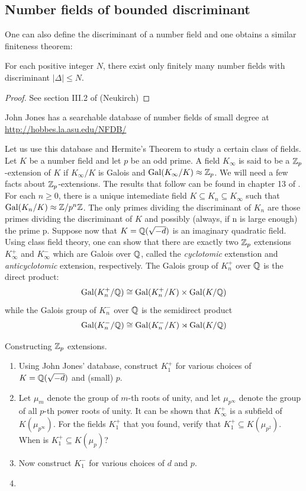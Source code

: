 \documentclass{book}
\begin{document}
\subsection{Number fields of bounded discriminant}

One can also define the discriminant of a number field and one obtains a
similar finiteness theorem:

\begin{theorem}
For each positive integer $N$, there exist only finitely many number
fields with discriminant $|\Delta| \leq N$.
\end{theorem}
\begin{proof}
See section III.2 of (Neukirch)
\end{proof}

John Jones has a searchable database of number fields of small degree
at \url{http://hobbes.la.asu.edu/NFDB/}

Let us use this database and Hermite's Theorem to study a certain class
of fields.  Let $K$ be a number field and let $p$ be an odd prime.  A field
$K_\infty$ is said to be a $\mathbb{Z}_p$-extension of $K$ if $K_\infty/K$ is Galois
and $\mathrm{Gal}(K_\infty/K) \approx \mathbb{Z}_p$.  We will need a few facts
about $\mathbb{Z}_p$-extensions.  The results that follow can be found in
chapter 13 of \cite{washington:cyclo}.
For each $n \geq 0$, there is a unique intemediate field
$K \subseteq K_n \subseteq K_\infty$ such that $\mathrm{Gal}(K_n/K)
\approx \mathbb{Z}/p^n\mathbb{Z}$.  The only primes dividing the discriminant of $K_n$
are those primes dividing the discriminant of $K$ and possibly (always,
if n is large enough) the prime p.  Suppose now that $K = \mathbb{Q}(\sqrt{-d})$
is an imaginary quadratic field.  Using class field theory, one can show
that there are exactly two $\mathbb{Z}_p$ extensions $K_\infty^+$ and
$K_\infty^-$ which are Galois over $\mathbb{Q}$, called the \textit{cyclotomic}
extenstion and \textit{anticyclotomic} extension, respectively.
The Galois group of $K_n^+$ over $\mathbb{Q}$ is the
direct product:
$$
\mathrm{Gal}(K_n^+/\mathbb{Q}) \cong \mathrm{Gal}(K_n^+/K) \times
\mathrm{Gal}(K/\mathbb{Q})
$$
while the Galois group of $K_n^-$ over $\mathbb{Q}$ is the semidirect product
$$
\mathrm{Gal}(K_n^-/\mathbb{Q}) \cong \mathrm{Gal}(K_n^-/K) \rtimes
\mathrm{Gal}(K/\mathbb{Q})
$$

\begin{exercise} Constructing $\mathbb{Z}_p$ extensions.
\begin{enumerate}
\item Using John Jones' database, construct $K_1^+$ for various choices
of $K = \mathbb{Q}(\sqrt{-d})$ and (small) $p$.
\item Let $\mu_m$ denote the group of $m$-th roots of unity,
and let $\mu_{p^{\infty}}$ denote the group of all $p$-th power
roots of unity.  It can be shown that $K_\infty^+$ is a subfield of
$K(\mu_{p^\infty})$.  For the fields $K_1^+$ that you found,
verify that $K_1^+ \subseteq K(\mu_{p^2})$. When is
$K_1^+ \subseteq K(\mu_p)$?
\item Now construct $K_1^-$ for various choices of $d$ and $p$.
\item
\end{enumerate}
\end{exercise}
\end{document}
